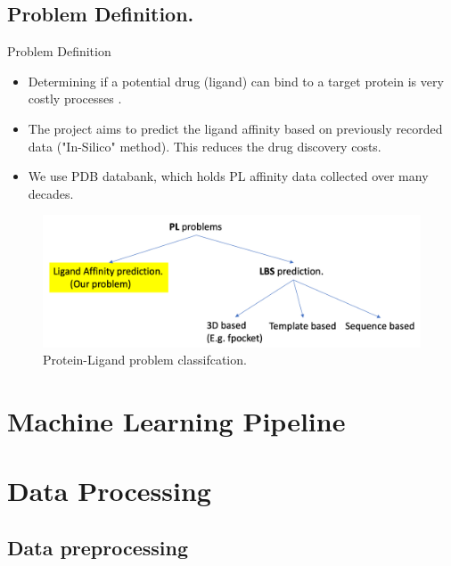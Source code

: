 \documentclass{beamer}
\begin{document}
\subsection{Problem Definition.}

\begin{frame}[t]{Problem Definition}

\begin{itemize}
\item Determining if a potential drug (ligand) can bind to a target protein is very costly processes \cite{drugdiscoverycost}.
\item The project aims to predict the ligand affinity based on previously recorded data ("In-Silico" method).  This reduces the drug discovery costs.
\item We use PDB databank,  which holds PL affinity data collected over many decades.
\end{itemize}

\begin{figure}[htb]
  \centering
    \includegraphics[scale=0.25]{images/pl_problem_classification}
    \caption{Protein-Ligand problem classifcation.}
    \label{fig:plproblemclassification}
\end{figure}


\end{frame}

\section{Machine Learning Pipeline}


\section{Data Processing}

\subsection{Data preprocessing}
\end{document}
